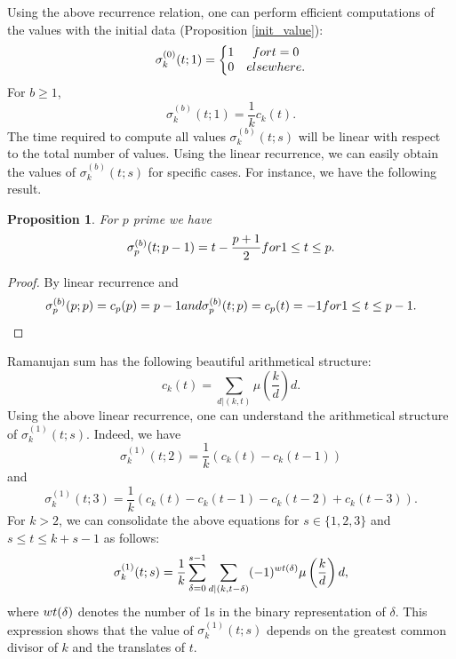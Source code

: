 \documentclass[12pt]{article}
\newtheorem{prop}[thm]{Proposition}%
\begin{document}
Using the above recurrence relation, one can perform efficient computations of the values with the initial data (Proposition \ref{init_value}):  
$$
\sigma^{(0)}_{k}(t;1)= \left\{\begin{matrix}
    1 & \textnormal{ for } t=0 \\
    0 & \textnormal{elsewhere}. 
\end{matrix}\right.
$$
For $b\geq 1$,
$$
\sigma^{(b)}_{k}(t;1)=\frac{1}{k}c_{k}(t).
$$
The time required to compute all values \(\sigma^{(b)}_{k}(t;s)\) will be linear with respect to the total number of values. Using the linear recurrence, we can easily obtain the values of \(\sigma_{k}^{(b)}(t;s)\) for specific cases. For instance, we have the following result.

\begin{prop} For $p$ prime we have 
    $$
    \sigma_{p}^{(b)}(t;p-1)= t-\frac{p+1}{2} \textnormal{ for } 1\leq t\leq p. 
    $$
\end{prop}
\begin{proof} By linear recurrence and 
$$
    \sigma_{p}^{(b)}(p;p)=c_{p}(p)=p-1 \textnormal{ and } \sigma_{p}^{(b)}(t;p)=c_{p}(t)=-1 \textnormal{ for } 1\leq t\leq p-1.
    $$
\end{proof}

Ramanujan sum has the following beautiful arithmetical structure:
$$
c_{k}(t)=\sum_{d|(k,t)}\mu\left(\frac{k}{d}\right)d.
$$
Using the above linear recurrence, one can understand the arithmetical structure of $\sigma^{(1)}_{k}(t;s)$. Indeed, we have 
$$
\sigma^{(1)}_{k}(t;2)=\frac{1}{k}\left(c_{k}(t)-c_{k}(t-1)\right) 
$$
and 
$$
\sigma^{(1)}_{k}(t;3)=\frac{1}{k}\left(c_{k}(t)-c_{k}(t-1)-c_{k}(t-2)+c_{k}(t-3)\right).
$$
For \( k > 2 \), we can consolidate the above equations for \( s \in \{1,2,3\} \) and \( s \leq t \leq k + s - 1 \) as follows:
\[
\sigma_{k}^{(1)}(t; s) = \frac{1}{k} \sum_{\delta = 0}^{s-1} \sum_{d \mid (k, t - \delta)} (-1)^{\textnormal{wt}(\delta)} \mu \left( \frac{k}{d} \right) d,
\]
where \( \textnormal{wt}(\delta) \) denotes the number of 1s in the binary representation of \( \delta \). This expression shows that the value of \( \sigma_{k}^{(1)}(t; s) \) depends on the greatest common divisor of $k$ and the translates of \( t \).
\end{document}

